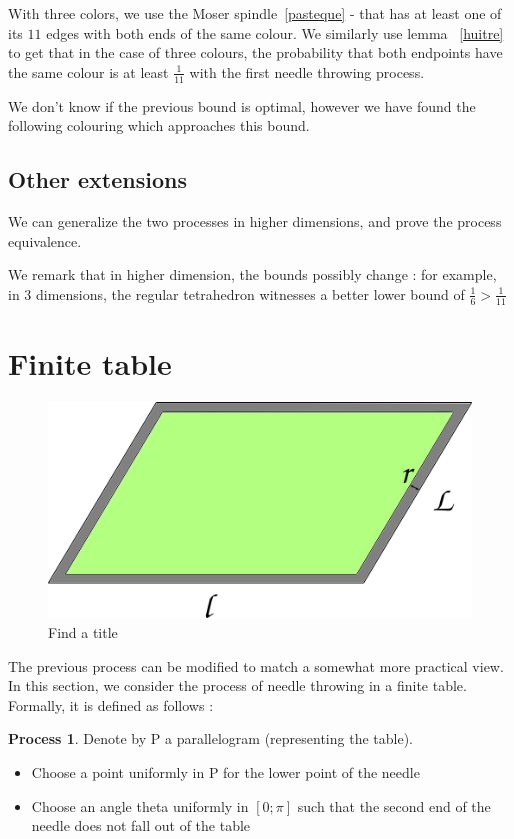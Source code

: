 \documentclass[a4paper,11pt]{article}
\theoremstyle{definition}
\newtheorem{process}{Process}
\theoremstyle{remark}
\begin{document}
 With three colors, we use the Moser spindle~\ref{pasteque} - that has at least one of its $11$ edges with both ends of the same colour.
 We similarly use lemma ~\ref{huitre} to get that in the case of three colours,
 the probability that both endpoints have the same colour is at least $\frac{1}{11}$ with the first needle throwing process. 

We don't know if the previous bound is optimal, however we have found the
following colouring which approaches this bound.
  

\subsection{Other extensions}
\label{dim}
We can generalize the two processes in higher dimensions, and prove the
process equivalence. %

We remark that in higher dimension, the bounds possibly change : for
example, in 3 dimensions, the regular tetrahedron witnesses a better lower bound
of $\frac 1 6 >\frac 1 {11}$   

\section{Finite table} \label{fini}

\begin{figure}[h]
\center
\includegraphics[scale=0.5]{tablefinie.png}
\caption{\label{tablefinie} Find a title}
\end{figure}
The previous process can be modified to match a somewhat more practical view. In this section, we consider the process of needle throwing in a finite table. 
Formally, it is defined as follows :
\begin{process}
Denote by P a parallelogram (representing the table). 
\begin{itemize}
\item Choose a point uniformly in P for the lower point of the needle
\item Choose an angle theta uniformly in $[0 ; \pi]$ such that the second end of the needle does not fall out of the table
\end{itemize}
\end{process}
\end{document}
